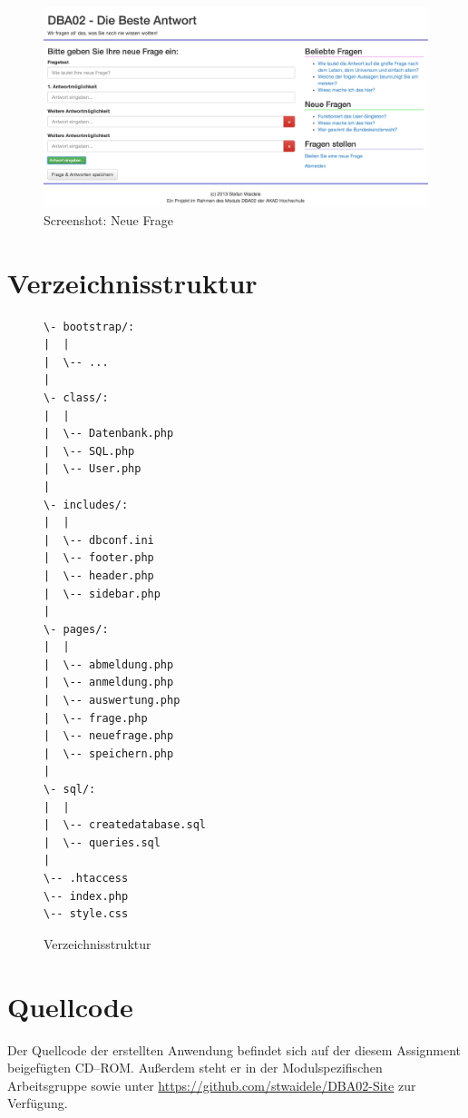 \begin{appendix}
\begin{figure}[H]
\includegraphics[width=\textwidth]{scr-neuefrage.jpg}
\caption{Screenshot: Neue Frage}
\label{scr:neuefrage}
\end{figure}

\section{Verzeichnisstruktur}

\begin{figure}[H]
\begin{spacing}{1.0}
\begin{verbatim}
\- bootstrap/:
|  |
|  \-- ...
|
\- class/:
|  |
|  \-- Datenbank.php
|  \-- SQL.php
|  \-- User.php
|
\- includes/:
|  |
|  \-- dbconf.ini
|  \-- footer.php
|  \-- header.php
|  \-- sidebar.php
|  
\- pages/:
|  |
|  \-- abmeldung.php
|  \-- anmeldung.php
|  \-- auswertung.php
|  \-- frage.php
|  \-- neuefrage.php
|  \-- speichern.php
| 
\- sql/:
|  |
|  \-- createdatabase.sql
|  \-- queries.sql
| 
\-- .htaccess
\-- index.php
\-- style.css
\end{verbatim}
\caption{Verzeichnisstruktur}
\label{bash:struktur}
\end{spacing}
\end{figure}

\section{Quellcode}

Der Quellcode der erstellten Anwendung befindet sich auf der diesem Assignment beigefügten CD--ROM. Außerdem steht er in der Modulspezifischen Arbeitsgruppe sowie unter \url{https://github.com/stwaidele/DBA02-Site} zur Verfügung.

\end{appendix}